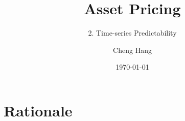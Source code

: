 \documentclass{beamer}
\title[Asset Pricing]{\textbf{Asset Pricing}} %
\subtitle{2. Time-series Predictability}
\author[Cheng Hang]{Cheng Hang} %
\institute[DUFE] %
{School of Fintech \\
	Dongbei University of Finance \& Economics \\ %
	\medskip
	\textbf{chenghangch@qq.com}%
}
\date{\today} %
\begin{document}
	
\begin{frame}
	\titlepage %
\end{frame}
	
	
	

\section{Rationale}
\end{document}
